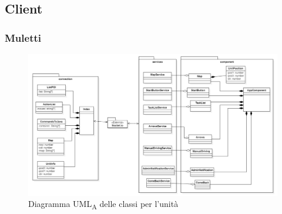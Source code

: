 \subsection{Client}
\subsubsection{Muletti}

\begin{figure}[H]
	\centering
	\includegraphics[scale=0.5]{res/images/UML_operatore.png}
	\caption{Diagramma UML\textsubscript{A} delle classi per l'unità}
\end{figure}

